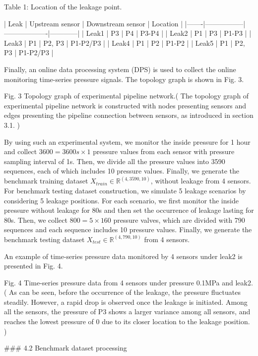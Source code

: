 Table 1: Location of the leakage point.

| Leak  | Upstream sensor | Downstream sensor | Location   |
|-------|-----------------|-------------------|------------|
| Leak1 | P3              | P4                | P3-P4      |
| Leak2 | P1              | P3                | P1-P3      |
| Leak3 | P1              | P2, P3            | P1-P2/P3   |
| Leak4 | P1              | P2                | P1-P2      |
| Leak5 | P1              | P2, P3            | P1-P2/P3   |

Finally, an online data processing system (DPS) is used to collect the online monitoring time-series pressure signals. The topology graph is shown in Fig. 3.

Fig. 3 Topology graph of experimental pipeline network.(
The topology graph of experimental pipeline network is constructed with nodes presenting sensors and edges presenting the pipeline connection between sensors, as introduced in section 3.1.
)

By using such an experimental system, we monitor the inside pressure for 1 hour and collect $3600=3600s \times 1$ pressure values from each sensor with pressure sampling interval of 1s. Then, we divide all the pressure values into 3590 sequences, each of which includes 10 pressure values. Finally, we generate the benchmark training dataset $X_{train} \in \mathbb{R}^{(4,3590,10)}$, without leakage from 4 sensors. For benchmark testing dataset construction, we simulate 5 leakage scenarios by considering 5 leakage positions. For each scenario, we first monitor the inside pressure without leakage for 80s and then set the occurrence of leakage lasting for 80s. Then, we collect $800=5 \times 160$ pressure valves, which are divided with 790 sequences and each sequence includes 10 pressure values. Finally, we generate the benchmark testing dataset $X_{test} \in \mathbb{R}^{(4,790,10)}$ from 4 sensors.

An example of time-series pressure data monitored by 4 sensors under leak2 is presented in Fig. 4.

Fig. 4 Time-series pressure data from 4 sensors under pressure 0.1MPa and leak2.(
As can be seen, before the occurrence of the leakage, the pressure fluctuates steadily. However, a rapid drop is observed once the leakage is initiated. Among all the sensors, the pressure of P3 shows a larger variance among all sensors, and reaches the lowest pressure of 0 due to its closer location to the leakage position.
)

### 4.2 Benchmark dataset processing

